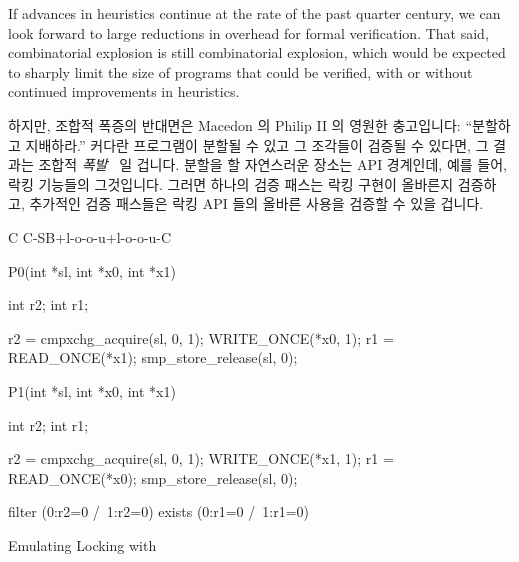 If advances in heuristics continue at the rate of the past quarter
century, we can look forward to large reductions in overhead for
formal verification.
That said, combinatorial explosion is still combinatorial explosion,
which would be expected to sharply limit the size of programs that
could be verified, with or without continued improvements in
heuristics.
\fi

하지만, 조합적 폭증의 반대면은 Macedon 의 Philip II 의 영원한 충고입니다:
``분할하고 지배하라.''
커다란 프로그램이 분할될 수 있고 그 조각들이 검증될 수 있다면, 그 결과는 조합적
\emph{폭발}~\cite{PaulEMcKenney2011Verico} 일 겁니다.
분할을 할 자연스러운 장소는 API 경계인데, 예를 들어, 락킹 기능들의 그것입니다.
그러면 하나의 검증 패스는 락킹 구현이 올바른지 검증하고, 추가적인 검증 패스들은
락킹 API 들의 올바른 사용을 검증할 수 있을 겁니다.
\iffalse

However, the flip side of combinatorial explosion is Philip II of
Macedon's timeless advice: ``Divide and rule.''
If a large program can be divided and the pieces verified, the result
can be combinatorial \emph{implosion}~\cite{PaulEMcKenney2011Verico}.
One natural place to divide is on API boundaries, for example, those
of locking primitives.
One verification pass can then verify that the locking implementation
is correct, and additional verification passes can verify correct
use of the locking APIs.
\fi

\begin{listing}[tbp]
{ \scriptsize
\begin{verbbox}[\LstLineNo]
C C-SB+l-o-o-u+l-o-o-u-C

{
}

P0(int *sl, int *x0, int *x1)
{
  int r2;
  int r1;

  r2 = cmpxchg_acquire(sl, 0, 1);
  WRITE_ONCE(*x0, 1);
  r1 = READ_ONCE(*x1);
  smp_store_release(sl, 0);
}

P1(int *sl, int *x0, int *x1)
{
  int r2;
  int r1;

  r2 = cmpxchg_acquire(sl, 0, 1);
  WRITE_ONCE(*x1, 1);
  r1 = READ_ONCE(*x0);
  smp_store_release(sl, 0);
}

filter (0:r2=0 /\ 1:r2=0)
exists (0:r1=0 /\ 1:r1=0)
\end{verbbox}
}
\centering
\theverbbox
\caption{Emulating Locking with }
\label{lst:future:Emulating Locking with cmpxchg}
\end{listing}

